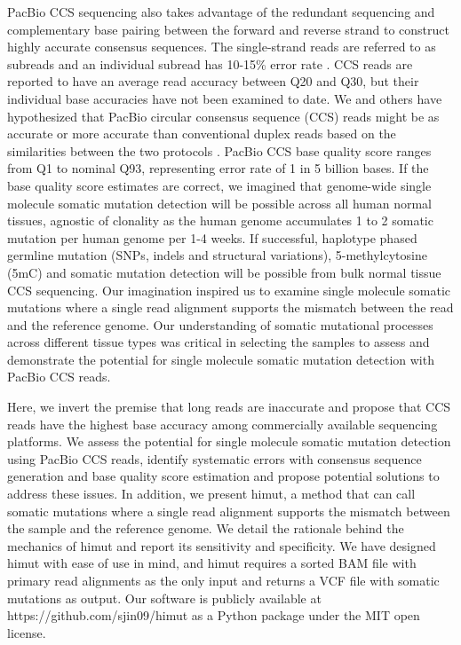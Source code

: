 PacBio CCS sequencing also takes advantage of the redundant sequencing and complementary base pairing between the forward and reverse strand to construct highly accurate consensus sequences. The single-strand reads are referred to as subreads and an individual subread has 10-15\% error rate \cite{Chaisson2012-vr}. CCS reads are reported to have an average read accuracy between Q20 and Q30, but their individual base accuracies have not been examined to date. We and others have hypothesized that PacBio circular consensus sequence (CCS) reads might be as accurate or more accurate than conventional duplex reads based on the similarities between the two protocols \cite{Wenger2019-pw}. PacBio CCS base quality score ranges from Q1 to nominal Q93, representing error rate of 1 in 5 billion bases. If the base quality score estimates are correct, we imagined that genome-wide single molecule somatic mutation detection will be possible across all human normal tissues, agnostic of clonality as the human genome accumulates 1 to 2 somatic mutation per human genome per 1-4 weeks. If successful, haplotype phased germline mutation (SNPs, indels and structural variations), 5-methylcytosine (5mC) and somatic mutation detection will be possible from bulk normal tissue CCS sequencing. Our imagination inspired us to examine single molecule somatic mutations where a single read alignment supports the mismatch between the read and the reference genome. Our understanding of somatic mutational processes across different tissue types was critical in selecting the samples to assess and demonstrate the potential for single molecule somatic mutation detection with PacBio CCS reads. 

Here, we invert the premise that long reads are inaccurate and propose that CCS reads have the highest base accuracy among commercially available sequencing platforms. We assess the potential for single molecule somatic mutation detection using PacBio CCS reads, identify systematic errors with consensus sequence generation and base quality score estimation and propose potential solutions to address these issues. In addition, we present himut, a method that can call somatic mutations where a single read alignment supports the mismatch between the sample and the reference genome. We detail the rationale behind the mechanics of himut and report its sensitivity and specificity. We have designed himut with ease of use in mind, and himut requires a sorted BAM file with primary read alignments as the only input and returns a VCF file with somatic mutations as output. Our software is publicly available at  https://github.com/sjin09/himut as a Python package under the MIT open license.

